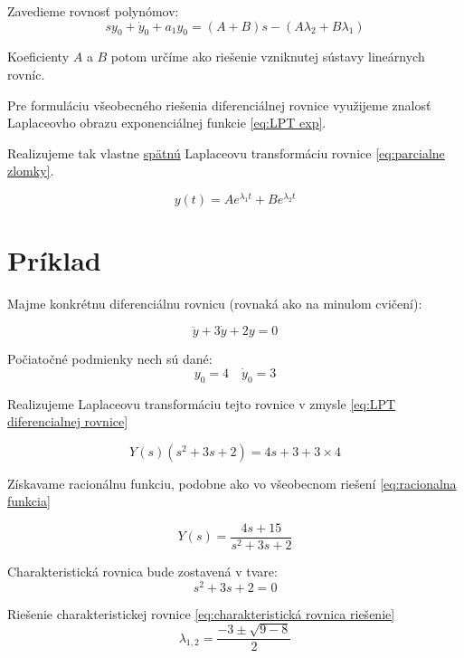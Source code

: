 \documentclass[a4paper,10pt]{article}
\begin{document}
Zavedieme rovnosť polynómov:
\begin{equation*}
sy_0+\dot{y}_0+a_1 y_0=(A+B)s-(A\lambda_2+B\lambda_1)
\end{equation*}

Koeficienty $A$ a $B$ potom určíme ako riešenie vzniknutej sústavy lineárnych rovníc.

Pre formuláciu všeobecného riešenia diferenciálnej rovnice využijeme znalosť Laplaceovho obrazu exponenciálnej funkcie \eqref{eq:LPT exp}.

Realizujeme tak vlastne \underline{spätnú} Laplaceovu transformáciu rovnice \eqref{eq:parcialne zlomky}.


\begin{equation}
\label{eq: riešenie všeobecné}
y(t)=Ae^{\lambda_1t}+Be^{\lambda_2t}
\end{equation}

\pagebreak

\section{Príklad}
Majme konkrétnu diferenciálnu rovnicu (rovnaká ako na minulom cvičení):

\begin{equation*}
\ddot{y}+3\dot{y}+2y=0 
\end{equation*}

Počiatočné podmienky nech sú dané:
\begin{equation*}
	y_0=4\quad \dot{y}_0=3
\end{equation*}

Realizujeme Laplaceovu transformáciu tejto rovnice v zmysle \eqref{eq:LPT diferencialnej rovnice}

\begin{equation*}
	Y(s)\left(s^2+3s+2\right)=4s+3+3\times4
\end{equation*}

Získavame racionálnu funkciu, podobne ako vo všeobecnom riešení \eqref{eq:racionalna funkcia}

\begin{equation*}
Y(s)=\frac{4s+15}{s^2+3s+2}
\end{equation*}

Charakteristická rovnica bude zostavená v tvare:
\begin{equation*}
	s^2+3s+2=0
\end{equation*}

Riešenie charakteristickej rovnice \eqref{eq:charakteristická rovnica riešenie}
\begin{equation*}
	\lambda_{1,2}=\frac{-3\pm\sqrt{9-8}}{2}
\end{equation*}
\end{document}
